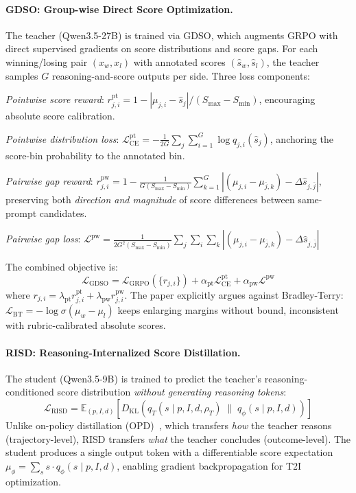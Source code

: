 \documentclass[11pt,a4paper]{article}
\begin{document}
\paragraph{GDSO: Group-wise Direct Score Optimization.} The teacher (Qwen3.5-27B) is trained via GDSO, which augments GRPO with direct supervised gradients on score distributions and score gaps. For each winning/losing pair $(x_w, x_l)$ with annotated scores $(\hat{s}_w, \hat{s}_l)$, the teacher samples $G$ reasoning-and-score outputs per side. Three loss components:

\emph{Pointwise score reward}: $r_{j,i}^{\mathrm{pt}} = 1 - |\mu_{j,i} - \hat{s}_j| / (S_{\max} - S_{\min})$, encouraging absolute score calibration.

\emph{Pointwise distribution loss}: $\mathcal{L}_{\mathrm{CE}}^{\mathrm{pt}} = -\frac{1}{2G}\sum_{j}\sum_{i=1}^{G} \log q_{j,i}(\hat{s}_j)$, anchoring the score-bin probability to the annotated bin.

\emph{Pairwise gap reward}: $r_{j,i}^{\mathrm{pw}} = 1 - \frac{1}{G(S_{\max} - S_{\min})}\sum_{k=1}^{G} |(\mu_{j,i} - \mu_{\bar{j},k}) - \Delta\hat{s}_{j,\bar{j}}|$, preserving both \emph{direction and magnitude} of score differences between same-prompt candidates.

\emph{Pairwise gap loss}: $\mathcal{L}^{\mathrm{pw}} = \frac{1}{2G^2(S_{\max} - S_{\min})}\sum_{j}\sum_{i}\sum_{k} |(\mu_{j,i} - \mu_{\bar{j},k}) - \Delta\hat{s}_{j,\bar{j}}|$

The combined objective is:
\begin{equation}
\mathcal{L}_{\mathrm{GDSO}} = \mathcal{L}_{\mathrm{GRPO}}(\{r_{j,i}\}) + \alpha_{\mathrm{pt}} \mathcal{L}_{\mathrm{CE}}^{\mathrm{pt}} + \alpha_{\mathrm{pw}} \mathcal{L}^{\mathrm{pw}}
\end{equation}
where $r_{j,i} = \lambda_{\mathrm{pt}} r_{j,i}^{\mathrm{pt}} + \lambda_{\mathrm{pw}} r_{j,i}^{\mathrm{pw}}$. The paper explicitly argues against Bradley-Terry: $\mathcal{L}_{\mathrm{BT}} = -\log \sigma(\mu_w - \mu_l)$ keeps enlarging margins without bound, inconsistent with rubric-calibrated absolute scores.

\paragraph{RISD: Reasoning-Internalized Score Distillation.} The student (Qwen3.5-9B) is trained to predict the teacher's reasoning-conditioned score distribution \emph{without generating reasoning tokens}:
\begin{equation}
\mathcal{L}_{\mathrm{RISD}} = \mathbb{E}_{(p,I,d)}\left[D_{\mathrm{KL}}\!\left(q_T(s \mid p, I, d, \rho_T) \;\|\; q_\phi(s \mid p, I, d)\right)\right]
\end{equation}
Unlike on-policy distillation (OPD)~\cite{agarwal2024opd}, which transfers \emph{how} the teacher reasons (trajectory-level), RISD transfers \emph{what} the teacher concludes (outcome-level). The student produces a single output token with a differentiable score expectation $\mu_\phi = \sum_s s \cdot q_\phi(s \mid p, I, d)$, enabling gradient backpropagation for T2I optimization.
\end{document}
